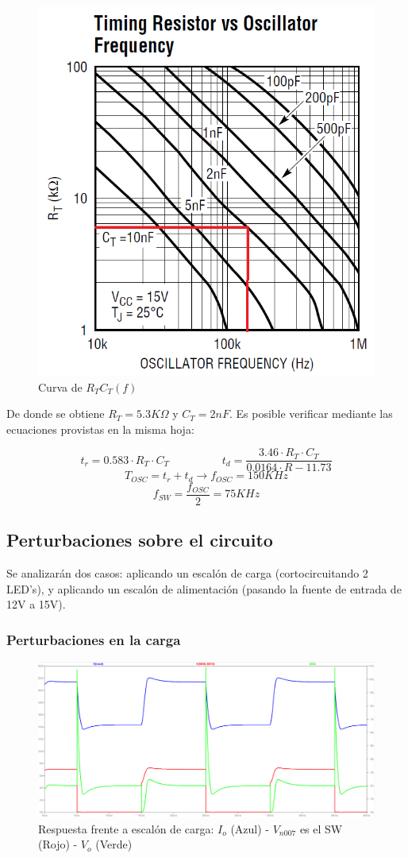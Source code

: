 \documentclass[e4_tp2_main.tex]{subfiles}
\begin{document}
\begin{figure}[H]
\centering
\includegraphics[width=0.3\linewidth]{Imagenes/Punto2/RT-OSC.png}
\caption{Curva de $R_TC_T(f)$}
\end{figure}

De donde se obtiene $R_T = 5.3K\Omega$ y $C_T = 2nF$. Es posible verificar mediante las ecuaciones provistas en la misma hoja:

\[
t_r = 0.583 \cdot R_T \cdot C_T \hspace{2cm} t_d = \frac{3.46 \cdot R_T \cdot C_T}{0.0164 \cdot R - 11.73}
\]
\[
T_{OSC} = t_r + t_d \longrightarrow f_{OSC} = 150KHz
\]
\[
f_{SW} = \frac{f_{OSC}}{2} = 75KHz
\]
\newpage
\subsection{Perturbaciones sobre el circuito}
Se analizarán dos casos: aplicando un escalón de carga (cortocircuitando 2 LED's), y aplicando un escalón de alimentación (pasando la fuente de entrada de 12V a 15V).
\subsubsection*{Perturbaciones en la carga}
\begin{figure}[H]
\centering
\includegraphics[width=0.7\linewidth]{Imagenes/Punto2/cargavariable-I-V.png}
\caption{Respuesta frente a escalón de carga: $I_o$ (Azul) - $V_{n007}$ es el SW (Rojo) - $V_o$ (Verde)}
\end{figure}
\end{document}
